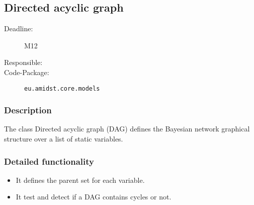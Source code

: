 \subsection{Directed acyclic graph}
\label{Functionality:ID}

\begin{description}
\item[Deadline:] M12
\item[Responsible:]
\item[Code-Package:] \texttt{eu.amidst.core.models}
\end{description}


\subsubsection*{Description}

The class Directed acyclic graph (DAG) defines the Bayesian network graphical structure over a list of static variables.

\subsubsection*{Detailed functionality}

\begin{itemize}
\item It defines the parent set for each variable.
\item It test and detect if a DAG contains cycles or not.
\end{itemize}
